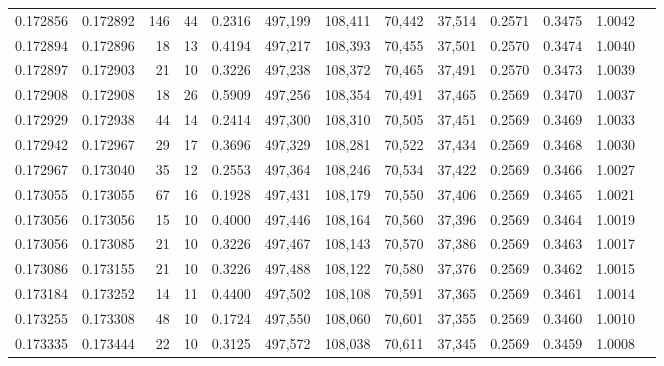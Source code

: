 \begin{tabular}{rrrrrrrrrrrrr}
0.172856 & 0.172892 &   146 &  44 &                                     0.2316 & 497,199 & 108,411 &  70,442 &  37,514 & 0.2571 & 0.3475 & 1.0042 \\
0.172894 & 0.172896 &    18 &  13 &                                     0.4194 & 497,217 & 108,393 &  70,455 &  37,501 & 0.2570 & 0.3474 & 1.0040 \\
0.172897 & 0.172903 &    21 &  10 &                                     0.3226 & 497,238 & 108,372 &  70,465 &  37,491 & 0.2570 & 0.3473 & 1.0039 \\
0.172908 & 0.172908 &    18 &  26 &                                     0.5909 & 497,256 & 108,354 &  70,491 &  37,465 & 0.2569 & 0.3470 & 1.0037 \\
0.172929 & 0.172938 &    44 &  14 &                                     0.2414 & 497,300 & 108,310 &  70,505 &  37,451 & 0.2569 & 0.3469 & 1.0033 \\
0.172942 & 0.172967 &    29 &  17 &                                     0.3696 & 497,329 & 108,281 &  70,522 &  37,434 & 0.2569 & 0.3468 & 1.0030 \\
0.172967 & 0.173040 &    35 &  12 &                                     0.2553 & 497,364 & 108,246 &  70,534 &  37,422 & 0.2569 & 0.3466 & 1.0027 \\
0.173055 & 0.173055 &    67 &  16 &                                     0.1928 & 497,431 & 108,179 &  70,550 &  37,406 & 0.2569 & 0.3465 & 1.0021 \\
0.173056 & 0.173056 &    15 &  10 &                                     0.4000 & 497,446 & 108,164 &  70,560 &  37,396 & 0.2569 & 0.3464 & 1.0019 \\
0.173056 & 0.173085 &    21 &  10 &                                     0.3226 & 497,467 & 108,143 &  70,570 &  37,386 & 0.2569 & 0.3463 & 1.0017 \\
0.173086 & 0.173155 &    21 &  10 &                                     0.3226 & 497,488 & 108,122 &  70,580 &  37,376 & 0.2569 & 0.3462 & 1.0015 \\
0.173184 & 0.173252 &    14 &  11 &                                     0.4400 & 497,502 & 108,108 &  70,591 &  37,365 & 0.2569 & 0.3461 & 1.0014 \\
0.173255 & 0.173308 &    48 &  10 &                                     0.1724 & 497,550 & 108,060 &  70,601 &  37,355 & 0.2569 & 0.3460 & 1.0010 \\
0.173335 & 0.173444 &    22 &  10 &                                     0.3125 & 497,572 & 108,038 &  70,611 &  37,345 & 0.2569 & 0.3459 & 1.0008 \\

\end{tabular}
